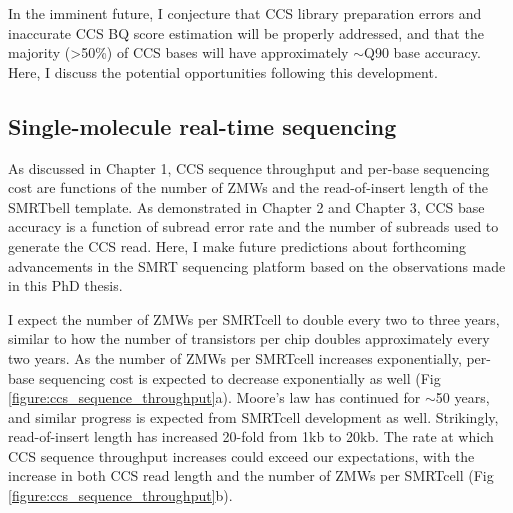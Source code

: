 In the imminent future, I conjecture that CCS library preparation errors and inaccurate CCS BQ score estimation will be properly addressed, and that the majority (>50\%) of CCS bases will have approximately $\sim$Q90 base accuracy. Here, I discuss the potential opportunities following this development.

\subsection{Single-molecule real-time sequencing}

As discussed in Chapter 1, CCS sequence throughput and per-base sequencing cost are functions of the number of ZMWs and the read-of-insert length of the SMRTbell template. As demonstrated in Chapter 2 and Chapter 3, CCS base accuracy is a function of subread error rate and the number of subreads used to generate the CCS read. Here, I make future predictions about forthcoming advancements in the SMRT sequencing platform based on the observations made in this PhD thesis. 

I expect the number of ZMWs per SMRTcell to double every two to three years, similar to how the number of transistors per chip doubles approximately every two years. As the number of ZMWs per SMRTcell increases exponentially, per-base sequencing cost is expected to decrease exponentially as well (Fig \ref{figure:ccs_sequence_throughput}a). Moore’s law has continued for $\sim$50 years, and similar progress is expected from SMRTcell development as well. Strikingly, read-of-insert length has increased 20-fold from 1kb to 20kb. The rate at which CCS sequence throughput increases could exceed our expectations, with the increase in both CCS read length and the number of ZMWs per SMRTcell (Fig \ref{figure:ccs_sequence_throughput}b). 


